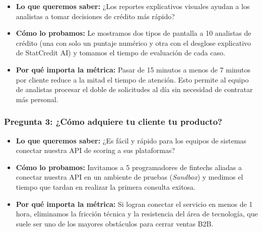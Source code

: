 \documentclass[11pt,a4paper]{article}
\begin{document}
\begin{tcolorbox}[colback=lightgray,colframe=secondary,title=\textbf{Experimento 2.2: Prueba de usabilidad de reportes con analistas de riesgo}]
\begin{itemize}[leftmargin=*]
    \item \textbf{Lo que queremos saber:} ¿Los reportes explicativos visuales ayudan a los analistas a tomar decisiones de crédito más rápido?
    \item \textbf{Cómo lo probamos:} Le mostramos dos tipos de pantalla a 10 analistas de crédito (una con solo un puntaje numérico y otra con el desglose explicativo de StatCredit AI) y tomamos el tiempo de evaluación de cada caso.
    \item \textbf{Por qué importa la métrica:} Pasar de 15 minutos a menos de 7 minutos por cliente reduce a la mitad el tiempo de atención. Esto permite al equipo de analistas procesar el doble de solicitudes al día sin necesidad de contratar más personal.
\end{itemize}
\end{tcolorbox}

\subsubsection{Pregunta 3: ¿Cómo adquiere tu cliente tu producto?}

\begin{tcolorbox}[colback=lightgray,colframe=secondary,title=\textbf{Experimento 3.1: Prueba de facilidad de integración de la API}]
\begin{itemize}[leftmargin=*]
    \item \textbf{Lo que queremos saber:} ¿Es fácil y rápido para los equipos de sistemas conectar nuestra API de scoring a sus plataformas?
    \item \textbf{Cómo lo probamos:} Invitamos a 5 programadores de fintechs aliadas a conectar nuestra API en un ambiente de pruebas (\textit{Sandbox}) y medimos el tiempo que tardan en realizar la primera consulta exitosa.
    \item \textbf{Por qué importa la métrica:} Si logran conectar el servicio en menos de 1 hora, eliminamos la fricción técnica y la resistencia del área de tecnología, que suele ser uno de los mayores obstáculos para cerrar ventas B2B.
\end{itemize}
\end{tcolorbox}
\end{document}
